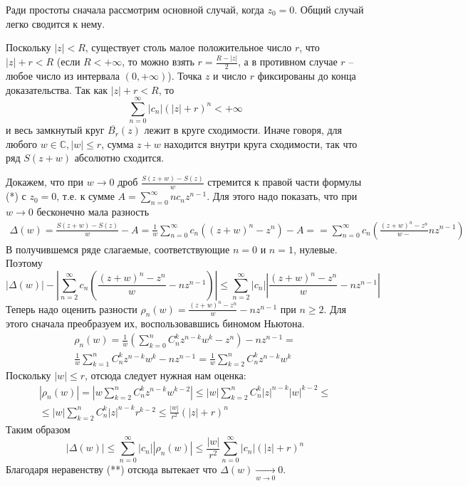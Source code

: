 \documentclass[main]{subfiles}
\begin{document}
\begin{longProof}
    Ради простоты сначала рассмотрим основной случай, когда $z_0 = 0$. Общий случай легко сводится к нему.
    
    Поскольку $|z| < R$, существует столь малое положительное число $r$, что $|z| + r < R$ 
    (если $R < +\infty$, то можно взять $r = \frac{R-|z|}{2}$, а в противном случае $r$ -- любое
    число из интервала $(0, + \infty)$). Точка $z$ и число $r$ фиксированы до конца доказательства.
    Так как $|z| + r < R$,  то
    \[ \sum^\infty_{n=0} |c_n| (|z|+r)^n < +\infty  \tag {**}\]
    и весь замкнутый круг $\overline{B_r}(z)$ лежит в круге сходимости. Иначе говоря, для любого
    $w \in \mathbb{C}, |w| \leq r$, сумма $z+w$ находится внутри круга сходимости, так что ряд $S(z+w)$ абсолютно сходится.

    Докажем, что при $w \to 0$ дроб $\frac{S(z+w)-S(z)}{w}$ стремится к правой части формулы (*) с $z_0 = 0$,
    т.е. к сумме $A = \sum^\infty_{n=0} nc_nz^{n-1}$. Для этого надо показать, что при $w \to 0$ бесконечно мала разность
    \begin{multline*}
        \Delta(w) = \frac{S(z+w)-S(z)}{w} - A = \frac{1}{w} \sum^\infty_{n=0}c_n((z+w)^n-z^n) - A = 
        = \sum^\infty_{n=0} c_n \left( \frac{(z+w)^n - z^n}{w -} nz^{n-1} \right)
    \end{multline*} 
    В получившемся ряде слагаемые, соответствующие $n = 0$ и $n= 1$, нулевые. Поэтому
    \[ |\Delta(w)| - \left| \sum^\infty_{n=2} c_n \left( \frac{(z+w)^n-z^n}{w} -nz^{n-1} \right) \right| \leq
    \sum^\infty_{n=2}|c_n| \left| \frac{(z+w)^n-z^n}{w} - nz^{n-1}\right| \]
    Теперь надо оценить разности $\rho_n(w) = \frac{(z+w)^n-z^n}{w} -nz^{n-1}$ при $n \geq 2$. Для
    этого сначала преобразуем их, воспользовавшись биномом Ньютона.
    \begin{multline}
        \rho_n(w) = \frac{1}{w} \left( \sum^n_{k=0}C^k_n z^{n-k}w^k-z^n \right) - nz^{n-1} =\\
        \frac{1}{w} \sum^n_{k=1}C^k_nz^{n-k}w^k - nz^{n-1} = \frac{1}{w} \sum^n_{k=2} C^k_n z^{n-k} w^k
    \end{multline}
    Поскольку $|w| \leq r$, отсюда следует нужная нам оценка:
    \begin{multline}
        |\rho_n(w)| = \left| w \sum^n_{k=2} C^k_n z^{n-k}w^{k-2} \right| \leq |w| \sum^n_{k=2} C^k_n|z|^{n-k}|w|^{k-2} \leq \\
        \leq |w| \sum^n_{k=2}C^k_n |z|^{n-k} r^{k-2} \leq \frac{|w|}{r^2}(|z|+r)^n
    \end{multline}
    Таким образом
    \[ |\Delta(w)| \leq \sum^\infty_{n=0} |c_n| |\rho_n(w)| \leq \frac{|w|}{r^2} \sum^\infty_{n=0} |c_n| (|z|+r)^n \]
    Благодаря неравенству (**) отсюда вытекает что $\Delta(w) \underset{w \to 0}{\longrightarrow} 0$.


\end{longProof}
\end{document}
